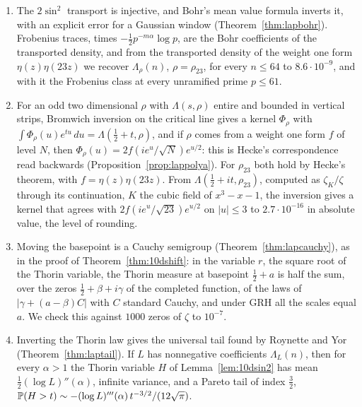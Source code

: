 \begin{enumerate}
\item[(1)] The $2\sin^2$ transport is injective, and Bohr's mean value formula inverts it, with an explicit error for a Gaussian window (Theorem~\ref{thm:lapbohr}). Frobenius traces, times $-\frac12p^{-m\alpha}\log p$, are the Bohr coefficients of the transported density, and from the transported density of the weight one form $\eta(z)\eta(23z)$ we recover $\Lambda_\rho(n)$, $\rho=\rho_{23}$, for every $n\le64$ to $8.6\cdot10^{-9}$, and with it the Frobenius class at every unramified prime $p\le61$.
\item[(2)] For an odd two dimensional $\rho$ with $\Lambda(s,\rho)$ entire and bounded in vertical strips, Bromwich inversion on the critical line gives a kernel $\Phi_\rho$ with $\int\Phi_\rho(u)e^{tu}\,du=\Lambda(\frac12+t,\rho)$, and if $\rho$ comes from a weight one form $f$ of level $N$, then $\Phi_\rho(u)=2f(ie^u/\sqrt N)e^{u/2}$: this is Hecke's correspondence read backwards (Proposition~\ref{prop:lappolya}). For $\rho_{23}$ both hold by Hecke's theorem, with $f=\eta(z)\eta(23z)$. From $\Lambda(\frac12+it,\rho_{23})$, computed as $\zeta_K/\zeta$ through its continuation, $K$ the cubic field of $x^3-x-1$, the inversion gives a kernel that agrees with $2f(ie^u/\sqrt{23})e^{u/2}$ on $|u|\le3$ to $2.7\cdot10^{-16}$ in absolute value, the level of rounding.
\item[(3)] Moving the basepoint is a Cauchy semigroup (Theorem~\ref{thm:lapcauchy}), as in the proof of Theorem~\ref{thm:10dshift}: in the variable $r$, the square root of the Thorin variable, the Thorin measure at basepoint $\frac12+a$ is half the sum, over the zeros $\frac12+\beta+i\gamma$ of the completed function, of the laws of $|\gamma+(a-\beta)C|$ with $C$ standard Cauchy, and under GRH all the scales equal $a$. We check this against $1000$ zeros of $\zeta$ to $10^{-7}$.
\item[(4)] Inverting the Thorin law gives the universal tail found by Roynette and Yor \cite{roynetteyor2005} (Theorem~\ref{thm:laptail}). If $L$ has nonnegative coefficients $\Lambda_L(n)$, then for every $\alpha>1$ the Thorin variable $H$ of Lemma~\ref{lem:10dsin2} has mean $\frac12(\log L)''(\alpha)$, infinite variance, and a Pareto tail of index $\frac32$, $\mathbb{P}(H>t)\sim-(\log L)'''(\alpha)\,t^{-3/2}/(12\sqrt\pi)$.

\end{enumerate}
